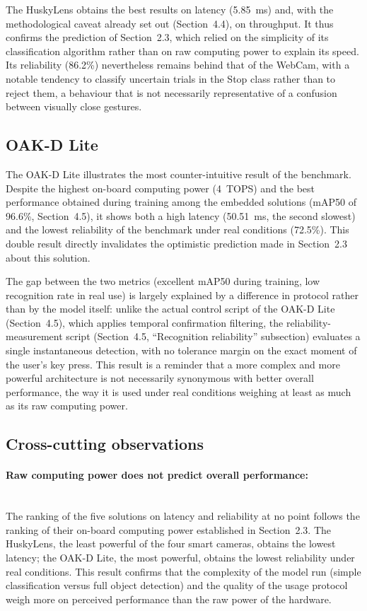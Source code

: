 \documentclass[12pt,a4paper]{report}
\begin{document}
	The HuskyLens obtains the best results on latency (5.85~ms) and, with the methodological caveat already set out (Section~4.4), on throughput. It thus confirms the prediction of Section~2.3, which relied on the simplicity of its classification algorithm rather than on raw computing power to explain its speed. Its reliability (86.2\%) nevertheless remains behind that of the WebCam, with a notable tendency to classify uncertain trials in the Stop class rather than to reject them, a behaviour that is not necessarily representative of a confusion between visually close gestures.
	
	\subsection*{OAK-D Lite}
	
	The OAK-D Lite illustrates the most counter-intuitive result of the benchmark. Despite the highest on-board computing power (4~TOPS) and the best performance obtained during training among the embedded solutions (mAP50 of 96.6\%, Section~4.5), it shows both a high latency (50.51~ms, the second slowest) and the lowest reliability of the benchmark under real conditions (72.5\%). This double result directly invalidates the optimistic prediction made in Section~2.3 about this solution.
	
	The gap between the two metrics (excellent mAP50 during training, low recognition rate in real use) is largely explained by a difference in protocol rather than by the model itself: unlike the actual control script of the OAK-D Lite (Section~4.5), which applies temporal confirmation filtering, the reliability-measurement script (Section~4.5, ``Recognition reliability'' subsection) evaluates a single instantaneous detection, with no tolerance margin on the exact moment of the user's key press. This result is a reminder that a more complex and more powerful architecture is not necessarily synonymous with better overall performance, the way it is used under real conditions weighing at least as much as its raw computing power.
	
	\subsection*{Cross-cutting observations}
	
	\paragraph{Raw computing power does not predict overall performance:} \mbox{} \\
	The ranking of the five solutions on latency and reliability at no point follows the ranking of their on-board computing power established in Section~2.3. The HuskyLens, the least powerful of the four smart cameras, obtains the lowest latency; the OAK-D Lite, the most powerful, obtains the lowest reliability under real conditions. This result confirms that the complexity of the model run (simple classification versus full object detection) and the quality of the usage protocol weigh more on perceived performance than the raw power of the hardware.
	
\end{document}
